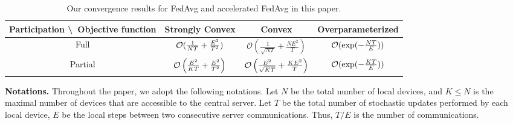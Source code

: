 \begin{table}[h!]
\centering
{\small
\begin{tabular}{|c|c|c|c|}\hline 
	Participation \textbackslash\ Objective function            & Strongly Convex        & Convex  & Overparameterized \\ \hline \hline
	Full                         & ${\mathcal{O}}(\frac{1}{NT}+\frac{E^{2}}{T^{2}})$    &  $\mathcal{O}\left(\frac{1}{\sqrt{NT}}+\frac{NE^{2}}{T}\right)$   & ${\mathcal{O}}(\exp(-\frac{NT}{E}))$    \\ \hline
	Partial                      &  ${\mathcal{O}}\left(\frac{E^{2}}{KT}+\frac{E^{2}}{T^{2}}\right)$   &  ${\mathcal{O}}\left(\frac{E^2}{\sqrt{KT}}+\frac{KE^2}{T} \right)$ & ${\mathcal{O}}(\exp(-\frac{KT}{E}))$     \\ \hline
\end{tabular}
}
\caption{Our convergence results for FedAvg and accelerated FedAvg in this paper.}
\label{tb:convergencerateintro}
\end{table}



\textbf{Notations.}
Throughout the paper, we adopt the following notations. Let $N$ be the total
number of local devices, and $K \leq N$ is the maximal number of devices
that are accessible to the central server.  Let $T$ be the total number of stochastic updates performed by each local device, $E$ be the local steps between two consecutive server communications. Thus, $T/E$ is
the number of communications.






